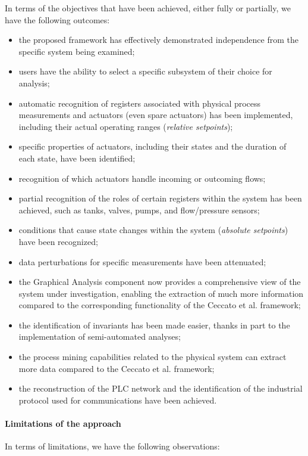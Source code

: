 In terms of the objectives that have been achieved, either fully or partially, we have the following outcomes:

\begin{itemize}
	\item the proposed framework has effectively demonstrated independence from the specific system being examined;
	\item users have the ability to select a specific subsystem of their choice for analysis;
	\item automatic recognition of registers associated with physical process measurements and actuators (even spare actuators) has been implemented, including their actual operating ranges (\textit{relative setpoints});
	\item specific properties of actuators, including their states and the duration of each state, have been identified;
	\item recognition of which actuators handle incoming or outcoming flows;
	\item partial recognition of the roles of certain registers within the system has been achieved, such as tanks, valves, pumps, and flow/pressure sensors;
	\item conditions that cause state changes within the system (\textit{absolute setpoints}) have been recognized;
	\item data perturbations for specific measurements have been attenuated;
	\item the Graphical Analysis component now provides a comprehensive view of the system under investigation, enabling the extraction of much more information compared to the corresponding functionality of the Ceccato et al. framework;
	\item the identification of invariants has been made easier, thanks in part to the implementation of semi-automated analyses;
	\item the process mining capabilities related to the physical system can extract more data compared to the Ceccato et al. framework;
	\item the reconstruction of the PLC network and the identification of the industrial protocol used for communications have been achieved.
\end{itemize}

\paragraph{Limitations of the approach} 
\label{par:7_limitations}
In terms of limitations, we have the following observations:

